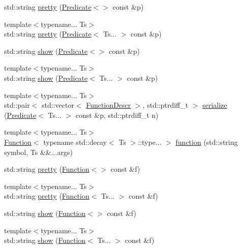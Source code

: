 \begin{DoxyCompactItemize}
\item 
std\+::string \hyperlink{namespacepfq_1_1lang_a5bd21fba49ed1266540c831a9110fec6}{pretty} (\hyperlink{structpfq_1_1lang_1_1Predicate}{Predicate}$<$$>$ const \&p)
\item 
{\footnotesize template$<$typename... Ts$>$ }\\std\+::string \hyperlink{namespacepfq_1_1lang_a365497365bebd1ef44492e8027a6b3c0}{pretty} (\hyperlink{structpfq_1_1lang_1_1Predicate}{Predicate}$<$ Ts... $>$ const \&p)
\item 
std\+::string \hyperlink{namespacepfq_1_1lang_aeb7cd494cccb45ea7a0a400a51811646}{show} (\hyperlink{structpfq_1_1lang_1_1Predicate}{Predicate}$<$$>$ const \&p)
\item 
{\footnotesize template$<$typename... Ts$>$ }\\std\+::string \hyperlink{namespacepfq_1_1lang_a42c749f45910e4c14d412cc3db5791e5}{show} (\hyperlink{structpfq_1_1lang_1_1Predicate}{Predicate}$<$ Ts... $>$ const \&p)
\item 
{\footnotesize template$<$typename... Ts$>$ }\\std\+::pair$<$ std\+::vector$<$ \hyperlink{structpfq_1_1lang_1_1FunctionDescr}{Function\+Descr} $>$, std\+::ptrdiff\+\_\+t $>$ \hyperlink{namespacepfq_1_1lang_ad631d8e32cf8613ad1f3f19f1b02cab6}{serialize} (\hyperlink{structpfq_1_1lang_1_1Predicate}{Predicate}$<$ Ts... $>$ const \&p, std\+::ptrdiff\+\_\+t n)
\item 
{\footnotesize template$<$typename... Ts$>$ }\\\hyperlink{structpfq_1_1lang_1_1Function}{Function}$<$ typename std\+::decay$<$ Ts $>$\+::type... $>$ \hyperlink{namespacepfq_1_1lang_a1a4638059d700ae08d0ca63886ff2bb3}{function} (std\+::string symbol, Ts \&\&...args)
\item 
std\+::string \hyperlink{namespacepfq_1_1lang_a2e0ab6225ca9d5195bbebc1c5c58b5fc}{pretty} (\hyperlink{structpfq_1_1lang_1_1Function}{Function}$<$$>$ const \&f)
\item 
{\footnotesize template$<$typename... Ts$>$ }\\std\+::string \hyperlink{namespacepfq_1_1lang_ae99e641e0f2d5461ed2c09ce92a82156}{pretty} (\hyperlink{structpfq_1_1lang_1_1Function}{Function}$<$ Ts... $>$ const \&f)
\item 
std\+::string \hyperlink{namespacepfq_1_1lang_aa99530de2408b7864fd641d2fd595f89}{show} (\hyperlink{structpfq_1_1lang_1_1Function}{Function}$<$$>$ const \&f)
\item 
{\footnotesize template$<$typename... Ts$>$ }\\std\+::string \hyperlink{namespacepfq_1_1lang_adb5a6dd5a3af8c170720c866a7839daa}{show} (\hyperlink{structpfq_1_1lang_1_1Function}{Function}$<$ Ts... $>$ const \&f)

\end{DoxyCompactItemize}
